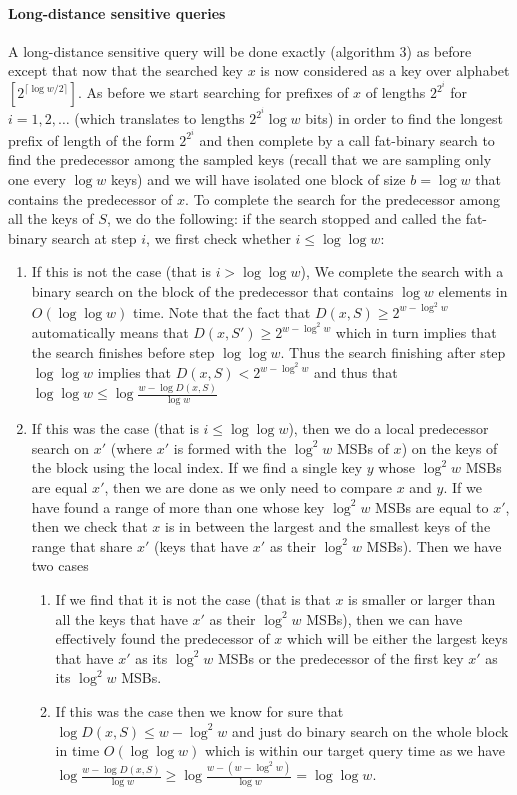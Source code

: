 \documentclass[a4paper,11pt]{article}
\newcommand{\?}{\mskip1.5mu}
\begin{document}
\paragraph{Long-distance sensitive queries}
A long-distance sensitive query will be done exactly (algorithm 3) as before except that now that the searched key $x$ is now considered as a key over alphabet $[2^{\lceil\log w/2\rceil}]$. As before we start searching for prefixes of $x$ of lengths $2^{2^i}$ for $i=1,2,\ldots$ (which translates to lengths $2^{2^i}\log w$ bits) in order to find the longest prefix of length of the form $2^{2^i}$ and then complete by a call fat-binary search to find the predecessor among the sampled keys (recall that we are sampling only one every $\log w$ keys) and we will have isolated one block of size $b=\log w$ that contains the predecessor of $x$. To complete the search for the predecessor among all the keys of $S$, we do the following: if the search stopped and called the fat-binary search at step $i$, we first check whether $i\leq\log\log w$:
\begin{enumerate}
\item If this is not the case (that is $i>\log\log w$), We complete the search with a binary search on the block of the predecessor that contains $\log w$ elements in $O(\log\log w)$ time. Note that the fact that $D(x,S)\geq 2^{w-\log^2w}$ automatically means that $D(x,S')\geq 2^{w-\log^2w}$ which in turn implies that the search finishes before step $\log\log w$. Thus the search finishing after step $\log\log w$ implies that $D(x,S)< 2^{w-\log^2w}$ and thus that $\log\log w\leq \log\frac{w-\log D(x,S)}{\log w}$
\item If this was the case (that is $i\leq\log\log w$), then we do a local predecessor search on $x'$ (where $x'$ is formed with the $\log^2 w$ MSBs of $x$) on the keys of the block using the local index. If we find a single key $y$ whose $\log^2 w$ MSBs are equal $x'$, then we are done as we only need to compare $x$ and $y$. If we have found a range of more than one whose key $\log^2 w$ MSBs are equal  to $x'$, then we check that $x$ is in between the largest and the smallest keys of the range that share $x'$ (keys that have $x'$ as their $\log^2w$ MSBs). Then we have two cases
\begin{enumerate}
\item If we find that it is not the case (that is that $x$ is smaller or larger than all the keys that have $x'$ as their $\log^2w$ MSBs), then we can have effectively found the predecessor of $x$ which will be either the largest keys that have $x'$ as its $\log^2w$ MSBs or the predecessor of the first key $x'$ as its $\log^2w$ MSBs. 
\item If this was the case then we know for sure that $\log D(x,S)\leq w-\log^2 w$ and just do binary search on the whole block in time $O(\log\log w)$  which is within our target query time as we have $\log\frac{w-\log D(x,S)}{\log w}\geq \log\frac{w-(w-\log^2w)}{\log w}=\log\log w$. 
\end{enumerate}
\end{enumerate}
\end{document}
